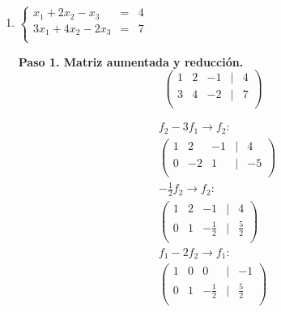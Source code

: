 \begin{prob}
\begin{enumerate}[$a)$]
\begin{myproof}
    \textbf{Paso 3. Solución paramétrica.}
    \[
    \boxed{\begin{pmatrix} x \\ y \\ z \end{pmatrix} =
    \begin{pmatrix} \frac{y}{2} - z - 2 \\ y \\ z \end{pmatrix} =
    y \begin{pmatrix} \frac{1}{2} \\ 1 \\ 0 \end{pmatrix} +
    z \begin{pmatrix} -1 \\ 0 \\ 1 \end{pmatrix} +
    \begin{pmatrix} -2 \\ 0 \\ 0 \end{pmatrix}}, \quad y,z \in \mathbb{R}.
    \]
    \end{myproof}

 \item  $\left\lbrace \begin{array}{ccc}
x_1+2x_2-x_3&=&4\\
3x_1+4x_2-2x_3&=&7\\
\end{array} \right. $ 
    
    \begin{myproof}
    \textbf{Paso 1. Matriz aumentada y reducción.}
    \[
    \begin{pmatrix}
    1 & 2 & -1 & | & 4 \\
    3 & 4 & -2 & | & 7 \\
    \end{pmatrix}
    \]
    
    \begin{align*}
    &f_2 - 3f_1 \to f_2: \\
    &\begin{pmatrix}
    1 & 2 & -1 & | & 4 \\
    0 & -2 & 1 & | & -5 \\
    \end{pmatrix} \\
    &-\frac{1}{2}f_2\to f_2: \\
    &\begin{pmatrix}
    1 & 2 & -1 & | & 4 \\
    0 & 1 & -\frac{1}{2} & | & \frac{5}{2} \\
    \end{pmatrix} \\
    &f_1 - 2f_2\to f_1: \\
    &\begin{pmatrix}
    1 & 0 & 0 & | & -1 \\
    0 & 1 & -\frac{1}{2} & | & \frac{5}{2} \\
    \end{pmatrix}
    \end{align*}
    

\end{myproof}
\end{enumerate}
\end{prob}
